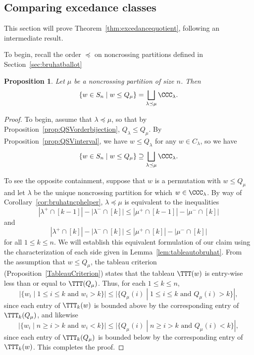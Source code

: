 \documentclass[12pt]{amsart}
\newtheorem{prop}[equation]{Proposition}
\theoremstyle{definition}
\theoremstyle{remark}
\numberwithin{equation}{section}
\begin{document}
\subsection{Comparing excedance classes}
\label{sec:ex3}

This section will prove Theorem~\ref{thm:excedancequotient}, following an intermediate result.

To begin, recall the order $\preceq$ on noncrossing partitions defined in Section~\ref{sec:bruhatballot}

\begin{prop}
\label{prop:Qdominates}
Let $\mu$ be a noncrossing partition of size $n$.  Then
\[
\{w \in S_{n} \;|\; w \le Q_{\mu}\} = \bigsqcup_{\lambda \preceq \mu} \CCC_{\lambda}.
\]
\end{prop}
\begin{proof}
To begin, assume that $\lambda \preceq \mu$, so that by Proposition~\ref{prop:QSVorderbijection}, $Q_{\lambda} \le Q_{\mu}$.  By Proposition~\ref{prop:QSVinterval}, we have $w \le Q_{\lambda}$ for any $w \in C_{\lambda}$, so we have
\[
\{w \in S_{n} \;|\; w \le Q_{\mu}\} \supseteq \bigsqcup_{\lambda \preceq \mu} \CCC_{\lambda}.
\]

To see the opposite containment, suppose that $w$ is a permutation with $w \le Q_{\mu}$ and let $\lambda$ be the unique noncrossing partition for which $w \in \CCC_{\lambda}$.  
By way of Corollary~\ref{cor:bruhatncphelper}, $\lambda \preceq \mu$ is equivalent to the inequalities
\[
|\lambda^{+} \cap [k-1]| - |\lambda^{-} \cap [k]| \le |\mu^{+} \cap [k-1]| - |\mu^{-} \cap [k]|
\]
and
\[
|\lambda^{+} \cap [k]| - |\lambda^{-} \cap [k]| \le |\mu^{+} \cap [k]| - |\mu^{-} \cap [k]|
\]
for all $1 \le k \le n$.  
We will establish this equivalent formulation of our claim using the characterization of each side given in Lemma~\ref{lem:tableautobruhat}.  
From the assumption that $w \le Q_{\mu}$, the tableau criterion (Proposition~\ref{TableauCriterion}) states that the tableau $\TTT(w)$ is entry-wise less than or equal to $\TTT(Q_{\mu})$.  
Thus, for each $1 \le k \le n$, 
\[
|\{w_{i} \;|\; \text{$1 \le i \le k$ and $w_{i} > k$} \}|
\le
|\{Q_{\mu}(i) \;|\; \text{$1 \le i \le k$ and $Q_{\mu}(i) > k$} \}|,
\]
since each entry of $\TTT_{k}(w)$ is bounded above by the corresponding entry of $\TTT_{k}(Q_{\mu})$, and likewise
\[
|\{ w_{i} \;|\; \text{$n \ge i > k$ and $w_{i} < k$} \}| 
\le
|\{ Q_{\mu}(i) \;|\; \text{$n \ge i > k$ and $Q_{\mu}(i) < k$} \}|,
\]
since each entry of $\TTT_{k}(Q_{\mu})$ is bounded below by the corresponding entry of $\TTT_{k}(w)$.  This completes the proof.
\end{proof}
\end{document}
